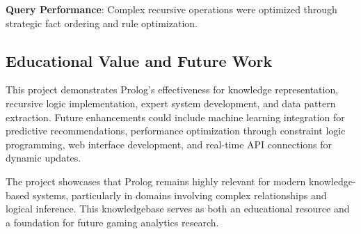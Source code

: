 \documentclass[12pt,a4paper]{article}
\begin{document}
\textbf{Query Performance}: Complex recursive operations were optimized through strategic fact ordering and rule optimization.

\subsection{Educational Value and Future Work}

This project demonstrates Prolog's effectiveness for knowledge representation,
recursive logic implementation, expert system development, and data pattern
extraction. Future enhancements could include machine learning integration for
predictive recommendations, performance optimization through constraint logic
programming, web interface development, and real-time API connections for
dynamic updates.

The project showcases that Prolog remains highly relevant for modern
knowledge-based systems, particularly in domains involving complex
relationships and logical inference. This knowledgebase serves as both an
educational resource and a foundation for future gaming analytics research.
\end{document}
